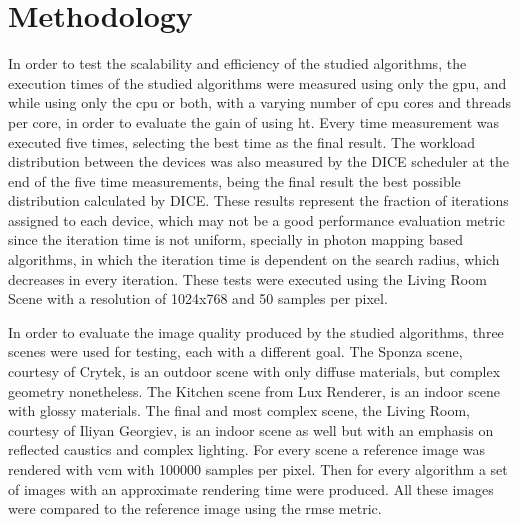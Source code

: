 


\section{Methodology}

In order to test the scalability and efficiency of the studied algorithms, the execution times of the studied algorithms were measured using only the \gls{gpu}, and while using only the \gls{cpu} or both, with a varying number of \gls{cpu} cores and threads per core, in order to evaluate the gain of using \gls{ht}. Every time measurement was executed five times, selecting the best time as the final result. The workload distribution between the devices was also measured by the DICE scheduler at the end of the five time measurements, being the final result the best possible distribution calculated by DICE. These results represent the fraction of iterations assigned to each device, which may not be a good performance evaluation metric since the iteration time is not uniform, specially in photon mapping based algorithms, in which the iteration time is dependent on the search radius, which decreases in every iteration. These tests were executed using the Living Room Scene with a resolution of 1024x768 and 50 samples per pixel.

In order to evaluate the image quality produced by the studied algorithms, three scenes were used for testing, each with a different goal. The Sponza scene, courtesy of Crytek, is an outdoor scene with only diffuse materials, but complex geometry nonetheless. The Kitchen scene from Lux Renderer, is an indoor scene with glossy materials. The final and most complex scene, the Living Room, courtesy of Iliyan Georgiev, is an indoor scene as well but with an emphasis on reflected caustics and complex lighting. For every scene a reference image was rendered with \gls{vcm} with 100000 samples per pixel. Then for every algorithm a set of images with an approximate rendering time were produced. All these images were compared to the reference image using the \gls{rmse} metric.

